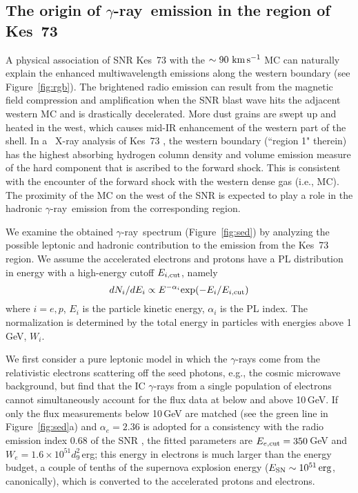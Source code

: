 \documentclass[12pt,preprint]{aastex}
\newcommand{\kms}{\,{\km\ps}}       \newcommand{\m}{\,{\rm m}}
\newcommand{\erg}{\,{\rm erg}}        \newcommand{\K}{\,{\rm K}}
\newcommand{\du}{d_{9}} \newcommand{\Du}{D_{20}}
\newcommand{\gray}{{\rm $\gamma$-ray}}
\begin{document}
\subsection{The origin of \gray~emission in the region of Kes~73}
\label{subsec:origin}

A physical association of SNR Kes~73 with  the $\sim90\kms$ MC 
can naturally explain the enhanced multiwavelength emissions
along the western boundary (see Figure~\ref{fig:rgb}).
The brightened radio emission can result from the magnetic field
compression and amplification when the SNR blast wave 
hits the adjacent western MC and is drastically decelerated.
More dust grains are swept up and heated in the west, which causes
mid-IR enhancement of the western part of the shell.
In a \Chandra\ X-ray analysis of Kes~73 \citep{Kumar2014kes73},
the western boundary (``region 1"  therein) has the highest absorbing
hydrogen column density and volume emission measure of the hard 
component that is ascribed to the forward shock.
This is consistent with the encounter of the forward shock with 
the western dense gas (i.e., MC).
%
The proximity of the MC on the west of the SNR
is expected to play a role in the hadronic \gray\ emission
from the corresponding region.

We examine the obtained \gray\ spectrum (Figure~\ref{fig:sed})
by analyzing the possible leptonic and hadronic contribution
to the emission from the Kes~73 region.
We assume the accelerated electrons and protons have a PL distribution
 in energy with a high-energy cutoff $E_{i,{\rm cut}}$, namely
\begin{equation}
dN_i/dE_i \propto E^{-\alpha_i} {\rm exp}(-E_i/E_{i,{\rm cut}})
\end{equation}
where $i = e,p$, $E_i$ is the particle kinetic energy, 
$\alpha_i$ is the PL index.  The normalization is determined 
by the total energy in particles with energies above 1 GeV, $W_i$.

We first consider a pure leptonic model in which the \gray{s} 
come from the relativistic electrons scattering off the seed photons, 
e.g., the cosmic microwave background,
but find that the IC \gray{s} from a single population of electrons 
cannot simultaneously account for
the flux data at below and above 10\,GeV.
If only the flux  measurements below 10\,GeV are matched
(see the green line in Figure~\ref{fig:sed}a)
and $\alpha_e= 2.36$ is adopted for a consistency with the radio
emission index 0.68 of the SNR \citep{Green2009snrcatalog},
the fitted parameters are $E_{e,{\rm cut}}=350$\,GeV 
and $W_e=1.6\times10^{51}\du^2$\,erg;
this  energy in electrons is much larger than the energy budget,
a couple of tenths
of the supernova explosion energy ($E_{\rm SN}\sim10^{51}\erg$, canonically),
which  is converted to the accelerated protons and electrons.
\end{document}
